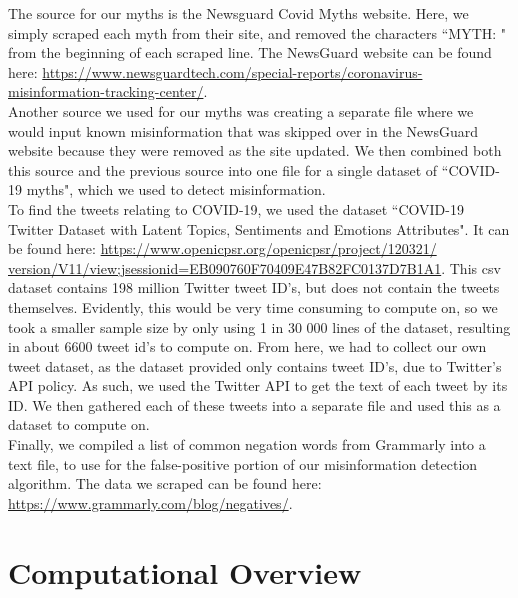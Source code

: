 \documentclass[fontsize=11pt]{article}
\begin{document}
    The source for our myths is the Newsguard Covid Myths website. Here, we simply scraped each myth from their site, and removed the characters ``MYTH: " from the beginning of each scraped line. The NewsGuard website can be found here: \href{https://www.newsguardtech.com/special-reports/coronavirus-misinformation-tracking-center/}{https://www.newsguardtech.com/special-reports/coronavirus-misinformation-tracking-center/}. \\
    Another source we used for our myths was creating a separate file where we would input known misinformation that was skipped over in the NewsGuard website because they were removed as the site updated. We then combined both this source and the previous source into one file for a single dataset of ``COVID-19 myths", which we used to detect misinformation.\\
    To find the tweets relating to COVID-19, we used the dataset ``COVID-19 Twitter Dataset with Latent Topics, Sentiments and Emotions Attributes". It can be found here: \href{https://www.openicpsr.org/openicpsr/project/120321/version/V11/view;jsessionid=EB090760F70409E47B82FC0137D7B1A1}{https://www.openicpsr.org/openicpsr/project/120321/\\version/V11/view;jsessionid=EB090760F70409E47B82FC0137D7B1A1}. This csv dataset contains 198 million Twitter tweet ID's, but does not contain the tweets themselves. Evidently, this would be very time consuming to compute on, so we took a smaller sample size by only using 1 in 30 000 lines of the dataset, resulting in about 6600 tweet id's to compute on. From here, we had to collect our own tweet dataset, as the dataset provided only contains tweet ID's, due to Twitter's API policy. As such, we used the Twitter API to get the text of each tweet by its ID. We then gathered each of these tweets into a separate file and used this as a dataset to compute on.\\
    Finally, we compiled a list of common negation words from Grammarly into a text file, to use for the false-positive portion of our misinformation detection algorithm. The data we scraped can be found here:\\ \href{https://www.grammarly.com/blog/negatives/}{https://www.grammarly.com/blog/negatives/}.

    \section*{Computational Overview}
\end{document}
